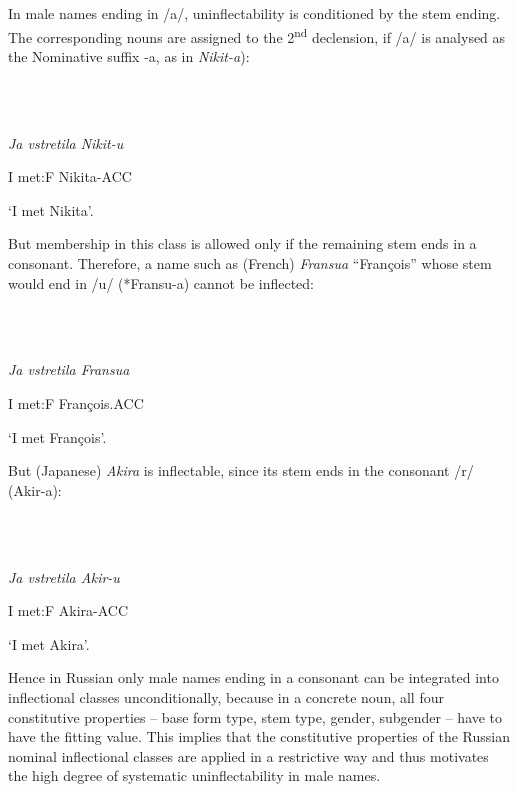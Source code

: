 \documentclass[output=paper]{langscibook}
\begin{document}
In male names ending in /a/, uninflectability is conditioned by the stem ending. The corresponding nouns are assigned to the 2\textsuperscript{nd} declension, if /a/ is analysed as the Nominative suffix -a, as in \textit{Nikit-a}):

\ea%
    \label{ex:key:6}
    \gll \\
         \\
    \glt
    \z %

         \textit{Ja vstretila Nikit-u} 

I met:F Nikita-ACC

‘I met Nikita’. 

But membership in this class is allowed only if the remaining stem ends in a consonant. Therefore, a name such as (French) \textit{Fransua} “François” whose stem would end in /u/ (*Fransu-a) cannot be inflected:

\ea%
    \label{ex:key:7}
    \gll \\
         \\
    \glt
    \z %

         \textit{Ja vstretila Fransua} 

I met:F François.ACC 

‘I met François’. 

But (Japanese) \textit{Akira} is inflectable, since its stem ends in the consonant /r/ (Akir-a):

\ea%
    \label{ex:key:8}
    \gll \\
         \\
    \glt
    \z %

         \textit{Ja vstretila Akir-u} 

I met:F Akira-ACC

‘I met Akira’. 

Hence in Russian only male names ending in a consonant can be integrated into inflectional classes unconditionally, because in a concrete noun, all four constitutive properties – base form type, stem type, gender, subgender – have to have the fitting value. This implies that the constitutive properties of the Russian nominal inflectional classes are applied in a restrictive way and thus motivates the high degree of systematic uninflectability in male names.
\end{document}
